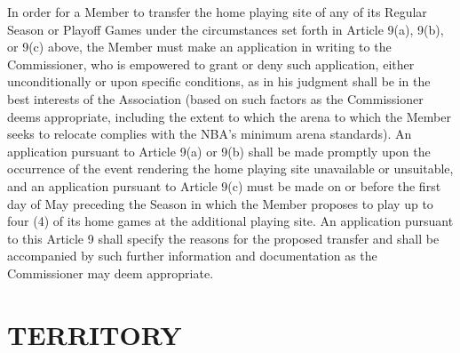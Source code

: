 \documentclass[]{book}
\begin{document}
In order for a Member to transfer the home playing site of any of its Regular Season or Playoff Games under the circumstances set forth in Article 9(a), 9(b), or 9(c) above, the Member must make an application in writing to the Commissioner, who is empowered to grant or deny such application, either unconditionally or upon specific conditions, as in his judgment shall be in the best interests of the Association (based on such factors as the Commissioner deems appropriate, including the extent to which the arena to which the Member seeks to relocate complies with the NBA's minimum arena standards). An application pursuant to Article 9(a) or 9(b) shall be made promptly upon the occurrence of the event rendering the home playing site unavailable or unsuitable, and an application pursuant to Article 9(c) must be made on or before the first day of May preceding the Season in which the Member proposes to play up to four (4) of its home games at the additional playing site. An application pursuant to this Article 9 shall specify the reasons for the proposed transfer and shall be accompanied by such further information and documentation as the Commissioner may deem appropriate.

\hypertarget{territory}{%
\section{TERRITORY}\label{territory}}
\end{document}
